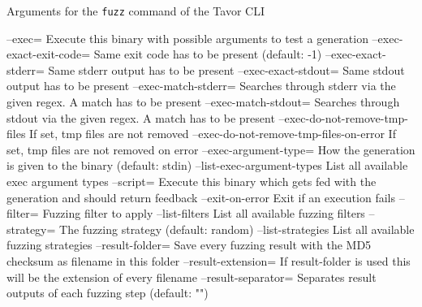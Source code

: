 \begin{landscape}
\begin{listing}
\caption{Arguments for the \texttt{fuzz} command of the Tavor CLI}
\label{lst:tavor-cli-fuzz-options}
\begin{textcode}
      --exec=                                    Execute this binary with possible arguments to test a generation
      --exec-exact-exit-code=                    Same exit code has to be present (default: -1)
      --exec-exact-stderr=                       Same stderr output has to be present
      --exec-exact-stdout=                       Same stdout output has to be present
      --exec-match-stderr=                       Searches through stderr via the given regex. A match has to be present
      --exec-match-stdout=                       Searches through stdout via the given regex. A match has to be present
      --exec-do-not-remove-tmp-files             If set, tmp files are not removed
      --exec-do-not-remove-tmp-files-on-error    If set, tmp files are not removed on error
      --exec-argument-type=                      How the generation is given to the binary (default: stdin)
      --list-exec-argument-types                 List all available exec argument types
      --script=                                  Execute this binary which gets fed with the generation and should return feedback
      --exit-on-error                            Exit if an execution fails
      --filter=                                  Fuzzing filter to apply
      --list-filters                             List all available fuzzing filters
      --strategy=                                The fuzzing strategy (default: random)
      --list-strategies                          List all available fuzzing strategies
      --result-folder=                           Save every fuzzing result with the MD5 checksum as filename in this folder
      --result-extension=                        If result-folder is used this will be the extension of every filename
      --result-separator=                        Separates result outputs of each fuzzing step (default: "\n")

\end{textcode}
\end{listing}
\end{landscape}


